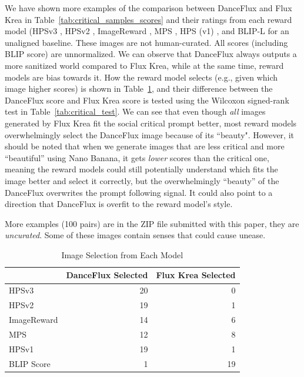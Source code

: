 We have shown more examples of the comparison between DanceFlux and Flux Krea in Table~\ref{tab:critical_samples_scores} and their ratings from each reward model (HPSv3 \cite{ma_hpsv3_2025}, HPSv2 \cite{wu_human_2023}, ImageReward \cite{xu_imagereward_2023}, MPS \cite{zhang_learning_2024}, HPS (v1) \cite{wu_human_2023_1}, and BLIP-L \cite{li_blip_2022} for an unaligned baseline. These images are not human-curated. All scores (including BLIP score) are unnormalized. We can observe that DanceFlux always outputs a more sanitized world compared to Flux Krea, while at the same time, reward models are bias towards it. How the reward model selects (e.g., given which image higher scores) is shown in Table~\ref{tab:critical_selection}, and their difference between the DanceFlux score and Flux Krea score is tested using the Wilcoxon signed-rank test in Table~\ref{tab:critical_test}. We can see that even though \textit{all} images generated by Flux Krea fit the social critical prompt better, most reward models overwhelmingly select the DanceFlux image because of its ``beauty". However, it should be noted that when we generate images that are less critical and more ``beautiful'' using Nano Banana, it gets \textit{lower} scores than the critical one, meaning the reward models could still potentially understand which fits the image better and select it correctly, but the overwhelmingly ``beauty'' of the DanceFlux overwrites the prompt following signal. It could also point to a direction that DanceFlux is overfit to the reward model's style.

More examples (100 pairs) are in the ZIP file submitted with this paper, they are \textit{uncurated}. Some of these images contain senses that could cause unease.  

\begin{table}[]
    \centering
    \begin{tabular}{lrr}
    \toprule
     & DanceFlux Selected & Flux Krea Selected \\
    \midrule
    HPSv3 & 20 & 0 \\
    HPSv2 & 19 & 1 \\
    ImageReward & 14 & 6 \\
    MPS & 12 & 8 \\
    HPSv1 & 19 & 1 \\
    BLIP Score & 1 & 19 \\
    \bottomrule
    \end{tabular}
    \caption{Image Selection from Each Model} 
    \label{tab:critical_selection}
\end{table}

